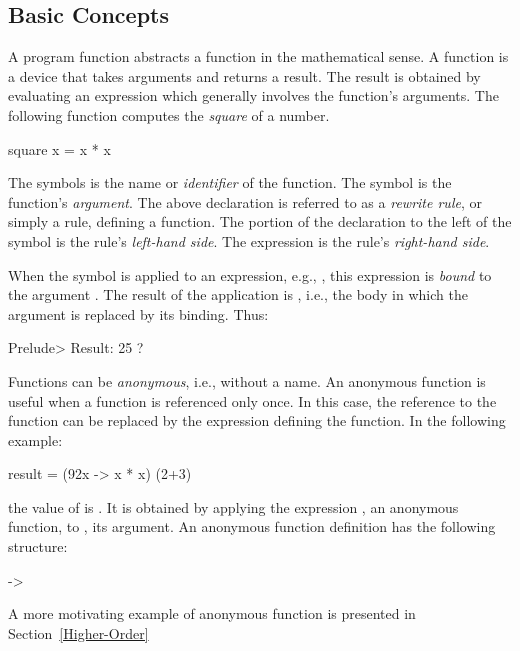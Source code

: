 \subsection{Basic Concepts}
\label{Basic concepts}

A program function abstracts a function in the mathematical sense.
A function is a device that takes arguments and returns a result.
The result is obtained by evaluating an expression
which generally involves the function's arguments.
The following function computes the \emph{square} of a number.
%
\begin{prog}
square x = x * x
\end{prog}
%
The symbols  is the name or
\emph{identifier} of the function.
The symbol  is the function's 
\emph{argument}.
The above declaration is referred to as a
\emph{rewrite rule}, or simply a rule,
defining a function.
The portion of the declaration to the left of the symbol \ccode{=}
is the rule's \emph{left-hand side}.
The expression  is the rule's
\emph{right-hand side}.

When the  symbol is applied to an expression,
e.g., , this expression is
\emph{bound}
to the argument .
The result of the application is
, i.e., the body
in which the argument is replaced by its binding.
Thus:
%
\begin{prog}
Prelude> 
Result: 25 ?
\end{prog}
%
Functions can be \emph{anonymous},
i.e., without a name.
An anonymous function is useful when a function is referenced
only once.  In this case, the reference to the function
can be replaced by the expression defining the function.
In the following example:
%
\begin{prog}
result = (\char92x -> x * x) (2+3)
\end{prog}
%
the value of  is .
It is obtained by applying the expression
, an anonymous function,
to , its argument.
An anonymous function definition has the following structure:
%
\begin{prog}
 -> 
\end{prog}
%
A more motivating example of anonymous function
is presented in Section~\ref{Higher-Order}

